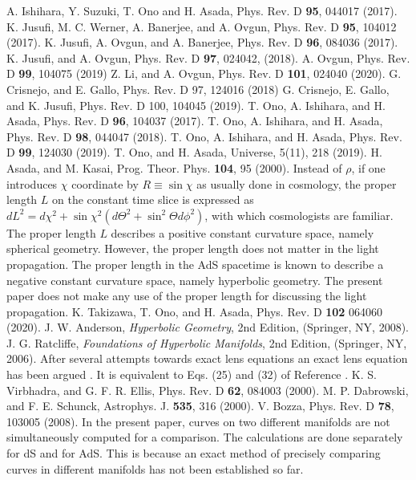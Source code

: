 \documentclass[twocolumn,showpacs,preprintnumbers,amsmath,amssymb]{revtex4-1}
\begin{document}
\begin{thebibliography}{99}
A. Ishihara, Y. Suzuki, T. Ono and H. Asada, Phys. Rev. D {\bf 95},
 044017 (2017).
K. Jusufi, M. C. Werner, A. Banerjee, and A. Ovgun, 
Phys. Rev. D {\bf 95}, 104012 (2017). 
K. Jusufi, A. Ovgun, and A. Banerjee, 
Phys. Rev. D {\bf 96}, 084036 (2017). 
K. Jusufi, and A. Ovgun, 
Phys. Rev. D {\bf 97}, 024042, (2018). 
A. Ovgun, 
Phys. Rev. D {\bf 99}, 104075 (2019)
Z. Li, and A. Ovgun, 
Phys. Rev. D {\bf 101}, 024040 (2020).
G. Crisnejo, and E. Gallo, 
Phys. Rev. D 97, 124016 (2018)
G. Crisnejo, E. Gallo, and K. Jusufi, 
Phys. Rev. D 100, 104045 (2019).
T. Ono, A. Ishihara, and H. Asada, Phys. Rev. D {\bf 96}, 104037 (2017).
T. Ono, A. Ishihara, and H. Asada, Phys. Rev. D {\bf 98}, 044047 (2018).
T. Ono, A. Ishihara, and H. Asada, Phys. Rev. D {\bf 99}, 124030 (2019). 
T. Ono, and H. Asada, Universe, 5(11), 218 (2019). 
H. Asada, and M. Kasai, 
Prog. Theor. Phys. {\bf 104}, 95 (2000). 
Instead of $\rho$, if one introduces $\chi$ coordinate by $R \equiv \sin\chi$ 
as usually done in cosmology, 
the proper length $L$ on the constant time slice is expressed as 
$dL^2 =  d\chi^2 + \sin\chi^2( d\Theta^2 + \sin^2 \Theta d\phi^2)$, 
with which cosmologists are familiar. 
The proper length $L$ describes a positive constant curvature space, 
namely spherical geometry. 
However, the proper length does not matter 
in the light propagation. 
The proper length in the AdS spacetime is known to describe 
a negative constant curvature space, namely hyperbolic geometry. 
The present paper does not make any use of the proper length 
for discussing the light propagation. 
K. Takizawa, T. Ono, and H. Asada, 
Phys. Rev. D {\bf 102} 064060 (2020). 
J. W. Anderson, 
{\it Hyperbolic Geometry}, 2nd Edition, 
(Springer, NY, 2008). 
J. G. Ratcliffe, 
{\it Foundations of Hyperbolic Manifolds}, 2nd Edition,  
(Springer, NY, 2006). 
After several attempts towards exact lens equations 
\cite{VE2000, DS} 
an exact lens equation has been argued
\cite{Bozza2008}. 
It is equivalent to Eqs. (25) and (32) of Reference \cite{Takizawa2020b}. 
K. S. Virbhadra, and G. F. R. Ellis,
Phys. Rev. D {\bf 62}, 084003 (2000).
M. P.  Dabrowski, and F. E. Schunck, 
Astrophys. J. {\bf 535}, 316 (2000). 
V. Bozza, Phys. Rev. D {\bf 78}, 103005 (2008).
In the present paper, 
curves on two different manifolds are not simultaneously computed 
for a comparison. 
The calculations are done separately for dS and for AdS. 
This is because an exact method of precisely comparing curves 
in different manifolds has not been established so far. 
\end{thebibliography}
\end{document}
